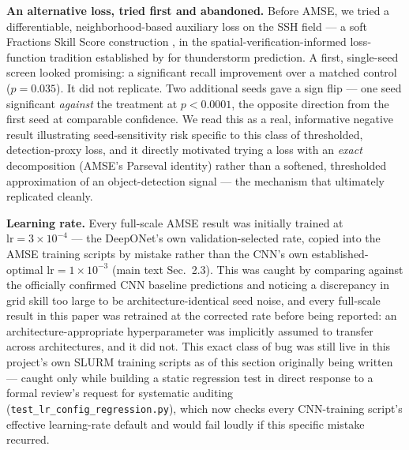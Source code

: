 \documentclass[11pt]{article}
\begin{document}
\textbf{An alternative loss, tried first and abandoned.} Before AMSE, we tried a differentiable, neighborhood-based auxiliary loss on the SSH field --- a soft Fractions Skill Score construction \citep[]{RobertsLean2008}, in the spatial-verification-informed loss-function tradition established by \citet{Lagerquist2022} for thunderstorm prediction. A first, single-seed screen looked promising: a significant recall improvement over a matched control ($p=0.035$). It did not replicate. Two additional seeds gave a sign flip --- one seed significant \textit{against} the treatment at $p<0.0001$, the opposite direction from the first seed at comparable confidence. We read this as a real, informative negative result illustrating seed-sensitivity risk specific to this class of thresholded, detection-proxy loss, and it directly motivated trying a loss with an \textit{exact} decomposition (AMSE's Parseval identity) rather than a softened, thresholded approximation of an object-detection signal --- the mechanism that ultimately replicated cleanly.

\textbf{Learning rate.} Every full-scale AMSE result was initially trained at $\mathrm{lr}=3\times10^{-4}$ --- the DeepONet's own validation-selected rate, copied into the AMSE training scripts by mistake rather than the CNN's own established-optimal $\mathrm{lr}=1\times10^{-3}$ (main text Sec.~2.3). This was caught by comparing against the officially confirmed CNN baseline predictions and noticing a discrepancy in grid skill too large to be architecture-identical seed noise, and every full-scale result in this paper was retrained at the corrected rate before being reported: an architecture-appropriate hyperparameter was implicitly assumed to transfer across architectures, and it did not. This exact class of bug was still live in this project's own SLURM training scripts as of this section originally being written --- caught only while building a static regression test in direct response to a formal review's request for systematic auditing (\texttt{test\_lr\_config\_regression.py}), which now checks every CNN-training script's effective learning-rate default and would fail loudly if this specific mistake recurred.
\end{document}

